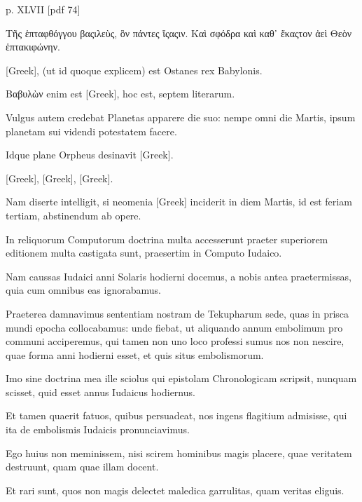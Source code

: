 \begin{parnumbers}
\clearpage
p. XLVII [pdf 74]

	\textgreek{Τῆς ἑπταφθόγγου βαςιλεὺς, ὃν πάντες ἴςαςιν.}
%
	\textgreek{Καὶ σφόδρα καὶ καθ᾿ ἕκαςτον ἀεὶ Θεὸν ἑπτακιφώνην.}

\textgreek{[Greek]}, (ut id quoque explicem) est Ostanes rex Babylonis.

\textgreek{Βαβυλὼν} enim est \textgreek{[Greek]},
 hoc est, septem literarum.

Vulgus autem credebat Planetas apparere die suo: nempe omni
die Martis, ipsum planetam sui videndi potestatem facere.

Idque plane Orpheus desinavit \textgreek{[Greek]}.

	\textgreek{[Greek]},
	\textgreek{[Greek]}, \textgreek{[Greek]}.

Nam diserte intelligit, si neomenia \textgreek{[Greek]} inciderit in diem
Martis, id est feriam tertiam, abstinendum ab opere.

In reliquorum
Computorum doctrina multa accesserunt praeter superiorem editionem
multa castigata sunt, praesertim in Computo Iudaico.

Nam
caussas Iudaici anni Solaris hodierni docemus, a nobis antea praetermissas,
quia cum omnibus eas ignorabamus.

Praeterea damnavimus sententiam nostram de Tekupharum sede, quas in prisca
mundi epocha collocabamus: unde fiebat, ut aliquando annum
embolimum pro communi acciperemus, qui tamen non uno loco
professi sumus nos non nescire, quae forma anni hodierni esset, et
quis situs embolismorum.

Imo sine doctrina mea ille sciolus qui
epistolam Chronologicam scripsit, nunquam scisset, quid esset
annus Iudaicus hodiernus.

Et tamen quaerit fatuos, quibus persuadeat,
nos ingens flagitium admisisse, qui ita de embolismis Iudaicis
pronunciavimus.

Ego huius non meminissem, nisi scirem hominibus
magis placere, quae veritatem destruunt, quam quae illam docent.

Et rari sunt, quos non magis delectet maledica garrulitas,
quam veritas eliguis.


\end{parnumbers}
